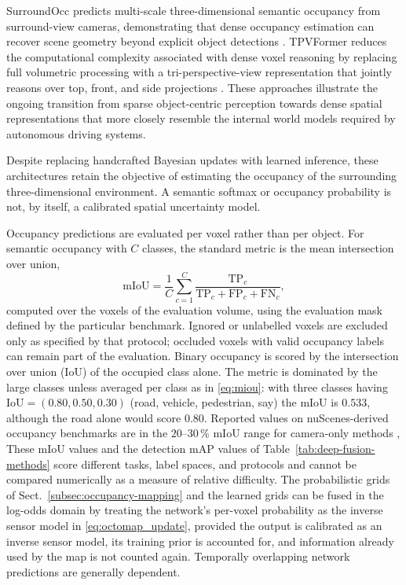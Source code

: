 SurroundOcc predicts multi-scale three-dimensional semantic occupancy from surround-view cameras, demonstrating that dense occupancy estimation can recover scene geometry beyond explicit object detections \cite{wei2023_surroundocc}. TPVFormer reduces the computational complexity associated with dense voxel reasoning by replacing full volumetric processing with a tri-perspective-view representation that jointly reasons over top, front, and side projections \cite{huang2023_tpvformer}. These approaches illustrate the ongoing transition from sparse object-centric perception towards dense spatial representations that more closely resemble the internal world models required by autonomous driving systems.

Despite replacing handcrafted Bayesian updates with learned inference, these architectures retain the objective of estimating the occupancy of the surrounding three-dimensional environment. A semantic softmax or occupancy probability is not, by itself, a calibrated spatial uncertainty model.

Occupancy predictions are evaluated per voxel rather than per object. For semantic occupancy with $C$ classes, the standard metric is the mean intersection over union,
\begin{equation}
\mathrm{mIoU}=\frac{1}{C}\sum_{c=1}^{C}\frac{\mathrm{TP}_c}{\mathrm{TP}_c+\mathrm{FP}_c+\mathrm{FN}_c},
\label{eq:miou}
\end{equation}
computed over the voxels of the evaluation volume, using the evaluation mask defined by the particular benchmark. Ignored or unlabelled voxels are excluded only as specified by that protocol; occluded voxels with valid occupancy labels can remain part of the evaluation. Binary occupancy is scored by the intersection over union (IoU) of the occupied class alone. The metric is dominated by the large classes unless averaged per class as in \eqref{eq:miou}: with three classes having $\mathrm{IoU}=(0.80,0.50,0.30)$ (road, vehicle, pedestrian, say) the mIoU is $0.533$, although the road alone would score $0.80$. Reported values on nuScenes-derived occupancy benchmarks are in the $20$--$30\,\%$ mIoU range for camera-only methods \cite{wei2023_surroundocc,huang2023_tpvformer}, These mIoU values and the detection mAP values of Table~\ref{tab:deep-fusion-methods} score different tasks, label spaces, and protocols and cannot be compared numerically as a measure of relative difficulty. The probabilistic grids of Sect.~\ref{subsec:occupancy-mapping} and the learned grids can be fused in the log-odds domain by treating the network's per-voxel probability as the inverse sensor model in \eqref{eq:octomap_update}, provided the output is calibrated as an inverse sensor model, its training prior is accounted for, and information already used by the map is not counted again. Temporally overlapping network predictions are generally dependent.

